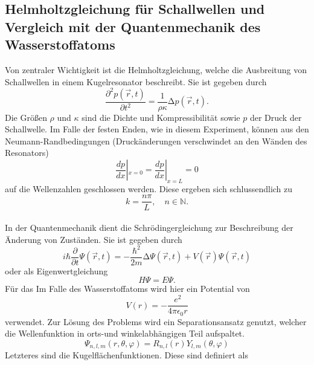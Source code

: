 \subsection{Helmholtzgleichung für Schallwellen und Vergleich mit der Quantenmechanik des Wasserstoffatoms}
\label{sec:t3}
Von zentraler Wichtigkeit ist die Helmholtzgleichung, welche die Ausbreitung 
von Schallwellen in einem Kugelresonator beschreibt. Sie ist gegeben durch 
\cite{helmholtzgl}
\begin{equation}
    \label{eqn:helmholtz}
    \frac{\partial^2 p(\vec{r},t)}{\partial t^2} = \frac{1}{\rho \kappa} \increment p(\vec{r},t).
\end{equation}
Die Größen $\rho$ und $\kappa$ sind die Dichte und Kompressibilität sowie $p$
der Druck der Schallwelle. Im Falle der festen Enden, wie in diesem Experiment,
können aus den Neumann-Randbedingungen (Druckänderungen verschwindet an den 
Wänden des Resonators)
\begin{equation*}
    \frac{dp}{dx}|_{x=0} = \frac{dp}{dx}|_{x=L} = 0
\end{equation*}
auf die Wellenzahlen geschlossen werden. Diese ergeben sich schlussendlich zu
\begin{equation*}
    k = \frac{n \pi}{L}, \quad n \in \mathbb{N}.
\end{equation*}
\vspace{0.5em} \\
\noindent In der Quantenmechanik dient die Schrödingergleichung zur Beschreibung 
der Änderung von Zuständen. Sie ist gegeben durch 
\begin{equation}
\label{eqn:sgl}
    i \hbar \frac{\partial}{\partial t} \Psi(\vec{r}, t) = - \frac{\hbar^2}{2m} \increment \Psi(\vec{r}, t) + V(\vec{r}) \Psi(\vec{r}, t)
\end{equation}
oder als Eigenwertgleichung
\begin{equation*}
    H \Psi = E \Psi.
\end{equation*}
Für das Im Falle des Wasserstoffatoms wird hier ein Potential von 
\begin{equation*}
    V(r) = -\frac{e^2}{4 \pi \epsilon_0 r}
\end{equation*}
verwendet. Zur Lösung des Problems wird ein Separationsansatz genutzt, welcher 
die Wellenfunktion in orts-und winkelabhängigen Teil aufspaltet.
\begin{equation*}
    \Psi_{n,l,m}(r, \theta, \varphi) = R_{n,l}(r) Y_{l,m}(\theta, \varphi)
\end{equation*}
Letzteres sind die Kugelflächenfunktionen. Diese sind definiert als
